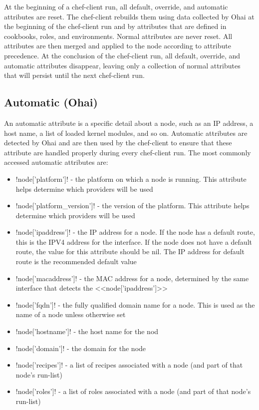 At the beginning of a chef-client run, all default, override, and automatic attributes are reset. The chef-client rebuilds them using data collected by Ohai at the beginning of the chef-client run and by attributes that are defined in cookbooks, roles, and environments. Normal attributes are never reset. All attributes are then merged and applied to the node according to attribute precedence. At the conclusion of the chef-client run, all default, override, and automatic attributes disappear, leaving only a collection of normal attributes that will persist until the next chef-client run.

\subsection{Automatic (Ohai)}

An automatic attribute is a specific detail about a node, such as an IP address, a host name, a list of loaded kernel modules, and so on. Automatic attributes are detected by Ohai and are then used by the chef-client to ensure that these attribute are handled properly during every chef-client run. The most commonly accessed automatic attributes are:

\begin{itemize}
  \item \inline!node['platform']! - the platform on which a node is running. This attribute helps determine which providers will be used
  \item \inline!node['platform_version']! - the version of the platform. This attribute helps determine which providers will be used
  \item \inline!node['ipaddress']! - the IP address for a node. If the node has a default route, this is the IPV4 address for the interface. If the node does not have a default route, the value for this attribute should be nil. The IP address for default route is the recommended default value
  \item \inline!node['macaddress']! - the MAC address for a node, determined by the same interface that detects the <<node['ipaddress']>>
  \item \inline!node['fqdn']! - the fully qualified domain name for a node. This is used as the name of a node unless otherwise set
  \item \inline!node['hostname']! - the host name for the nod
  \item \inline!node['domain']! - the domain for the node
  \item \inline!node['recipes']! - a list of recipes associated with a node (and part of that node’s run-list)
  \item \inline!node['roles']! - a list of roles associated with a node (and part of that node’s run-list)
\end{itemize}

